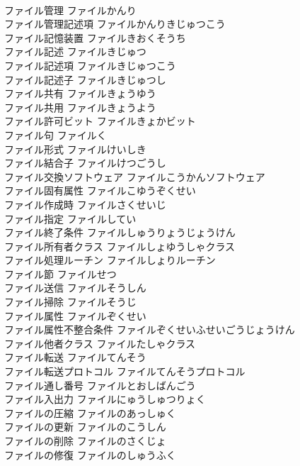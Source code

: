 \documentclass[8pt]{extreport}
\begin{document}
\begin{CJK}{UTF8}{min}
\\	ファイル管理	ファイルかんり	
\\	ファイル管理記述項	ファイルかんりきじゅつこう	
\\	ファイル記憶装置	ファイルきおくそうち	
\\	ファイル記述	ファイルきじゅつ	
\\	ファイル記述項	ファイルきじゅつこう	
\\	ファイル記述子	ファイルきじゅつし	
\\	ファイル共有	ファイルきょうゆう	
\\	ファイル共用	ファイルきょうよう	
\\	ファイル許可ビット	ファイルきょかビット	
\\	ファイル句	ファイルく	
\\	ファイル形式	ファイルけいしき	
\\	ファイル結合子	ファイルけつごうし	
\\	ファイル交換ソフトウェア	ファイルこうかんソフトウェア	
\\	ファイル固有属性	ファイルこゆうぞくせい	
\\	ファイル作成時	ファイルさくせいじ	
\\	ファイル指定	ファイルしてい	
\\	ファイル終了条件	ファイルしゅうりょうじょうけん	
\\	ファイル所有者クラス	ファイルしょゆうしゃクラス	
\\	ファイル処理ルーチン	ファイルしょりルーチン	
\\	ファイル節	ファイルせつ	
\\	ファイル送信	ファイルそうしん	
\\	ファイル掃除	ファイルそうじ	
\\	ファイル属性	ファイルぞくせい	
\\	ファイル属性不整合条件	ファイルぞくせいふせいごうじょうけん	
\\	ファイル他者クラス	ファイルたしゃクラス	
\\	ファイル転送	ファイルてんそう	
\\	ファイル転送プロトコル	ファイルてんそうプロトコル	
\\	ファイル通し番号	ファイルとおしばんごう	
\\	ファイル入出力	ファイルにゅうしゅつりょく	
\\	ファイルの圧縮	ファイルのあっしゅく	
\\	ファイルの更新	ファイルのこうしん	
\\	ファイルの削除	ファイルのさくじょ	
\\	ファイルの修復	ファイルのしゅうふく	

\end{CJK}
\end{document}
